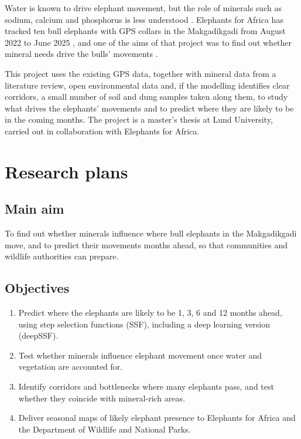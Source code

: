 \documentclass[12pt,a4paper]{article}
\begin{document}
Water is known to drive elephant movement, but the role of minerals such as sodium, calcium and phosphorus is less understood \cite{holdo,abraham}. Elephants for Africa has tracked ten bull elephants with GPS collars in the Makgadikgadi from August 2022 to June 2025 \cite{efa}, and one of the aims of that project was to find out whether mineral needs drive the bulls' movements \cite{aza}.

This project uses the existing GPS data, together with mineral data from a literature review, open environmental data and, if the modelling identifies clear corridors, a small number of soil and dung samples taken along them, to study what drives the elephants' movements and to predict where they are likely to be in the coming months. The project is a master's thesis at Lund University, carried out in collaboration with Elephants for Africa.

\section{Research plans}

\subsection{Main aim}
To find out whether minerals influence where bull elephants in the Makgadikgadi move, and to predict their movements months ahead, so that communities and wildlife authorities can prepare.

\subsection{Objectives}
\begin{enumerate}
\item Predict where the elephants are likely to be 1, 3, 6 and 12 months ahead, using step selection functions (SSF), including a deep learning version (deepSSF).
\item Test whether minerals influence elephant movement once water and vegetation are accounted for.
\item Identify corridors and bottlenecks where many elephants pass, and test whether they coincide with mineral-rich areas.
\item Deliver seasonal maps of likely elephant presence to Elephants for Africa and the Department of Wildlife and National Parks.
\end{enumerate}
\end{document}
